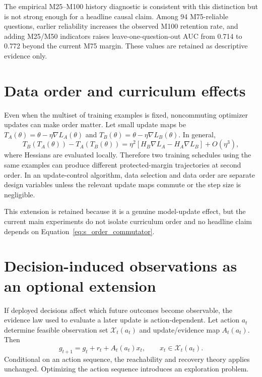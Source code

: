 \documentclass[11pt,letterpaper]{article}
\theoremstyle{plain}
\newcommand{\1}{\mathbf 1}
\begin{document}
The empirical M25--M100 history diagnostic is consistent with this distinction but is not strong enough for a headline causal claim. Among 94 M75-reliable questions, earlier reliability increases the observed M100 retention rate, and adding M25/M50 indicators raises leave-one-question-out AUC from 0.714 to 0.772 beyond the current M75 margin. These values are retained as descriptive evidence only.

\section{Data order and curriculum effects}
Even when the multiset of training examples is fixed, noncommuting optimizer updates can make order matter. Let small update maps be $T_A(\theta)=\theta-\eta\nabla L_A(\theta)$ and $T_B(\theta)=\theta-\eta\nabla L_B(\theta)$. In general,
\begin{equation}
 T_B(T_A(\theta))-T_A(T_B(\theta))
 =\eta^2\left[H_B\nabla L_A-H_A\nabla L_B\right]+O(\eta^3),
\label{eq:s_order_commutator}
\end{equation}
where Hessians are evaluated locally. Therefore two training schedules using the same examples can produce different protected-margin trajectories at second order. In an update-control algorithm, data selection and data order are separate design variables unless the relevant update maps commute or the step size is negligible.

This extension is retained because it is a genuine model-update effect, but the current main experiments do not isolate curriculum order and no headline claim depends on Equation~\ref{eq:s_order_commutator}.

\section{Decision-induced observations as an optional extension}
If deployed decisions affect which future outcomes become observable, the evidence law used to evaluate a later update is action-dependent. Let action $a_t$ determine feasible observation set $\mathcal X_t(a_t)$ and update/evidence map $A_t(a_t)$. Then
\begin{equation}
 g_{t+1}=g_t+r_t+A_t(a_t)x_t,
 \qquad x_t\in\mathcal X_t(a_t).
\label{eq:s_decision_induced}
\end{equation}
Conditional on an action sequence, the reachability and recovery theory applies unchanged. Optimizing the action sequence introduces an exploration problem.
\end{document}
